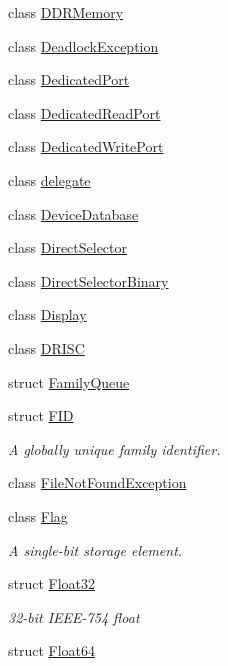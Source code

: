 \begin{DoxyCompactItemize}
\item 
class \hyperlink{class_simulator_1_1_d_d_r_memory}{D\+D\+R\+Memory}
\item 
class \hyperlink{class_simulator_1_1_deadlock_exception}{Deadlock\+Exception}
\item 
class \hyperlink{class_simulator_1_1_dedicated_port}{Dedicated\+Port}
\item 
class \hyperlink{class_simulator_1_1_dedicated_read_port}{Dedicated\+Read\+Port}
\item 
class \hyperlink{class_simulator_1_1_dedicated_write_port}{Dedicated\+Write\+Port}
\item 
class \hyperlink{class_simulator_1_1delegate}{delegate}
\item 
class \hyperlink{class_simulator_1_1_device_database}{Device\+Database}
\item 
class \hyperlink{class_simulator_1_1_direct_selector}{Direct\+Selector}
\item 
class \hyperlink{class_simulator_1_1_direct_selector_binary}{Direct\+Selector\+Binary}
\item 
class \hyperlink{class_simulator_1_1_display}{Display}
\item 
class \hyperlink{class_simulator_1_1_d_r_i_s_c}{D\+R\+I\+S\+C}
\item 
struct \hyperlink{struct_simulator_1_1_family_queue}{Family\+Queue}
\item 
struct \hyperlink{struct_simulator_1_1_f_i_d}{F\+I\+D}
\begin{DoxyCompactList}\small\item\em A globally unique family identifier. \end{DoxyCompactList}\item 
class \hyperlink{class_simulator_1_1_file_not_found_exception}{File\+Not\+Found\+Exception}
\item 
class \hyperlink{class_simulator_1_1_flag}{Flag}
\begin{DoxyCompactList}\small\item\em A single-\/bit storage element. \end{DoxyCompactList}\item 
struct \hyperlink{struct_simulator_1_1_float32}{Float32}
\begin{DoxyCompactList}\small\item\em 32-\/bit I\+E\+E\+E-\/754 float \end{DoxyCompactList}\item 
struct \hyperlink{struct_simulator_1_1_float64}{Float64}

\end{DoxyCompactItemize}
